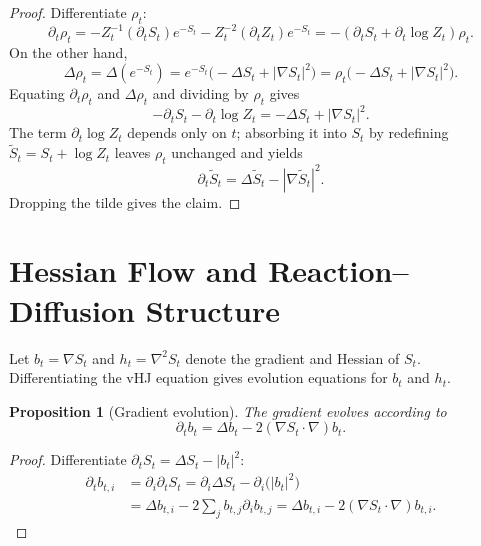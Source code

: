 \documentclass[11pt]{article}
\newtheorem{proposition}[theorem]{Proposition}
\begin{document}
\begin{proof}
Differentiate $\rho_t$:
\begin{equation}
  \partial_t\rho_t
  = -Z_t^{-1}(\partial_t S_t)e^{-S_t} - Z_t^{-2}(\partial_t Z_t)e^{-S_t}
  = -(\partial_t S_t + \partial_t\log Z_t)\rho_t.
\end{equation}
On the other hand,
\begin{equation}
  \Delta\rho_t
  = \Delta(e^{-S_t})
  = e^{-S_t}\big(-\Delta S_t + |\nabla S_t|^2\big)
  = \rho_t\big(-\Delta S_t + |\nabla S_t|^2\big).
\end{equation}
Equating $\partial_t\rho_t$ and $\Delta\rho_t$ and dividing by $\rho_t$
gives
\begin{equation}
  -\partial_t S_t - \partial_t\log Z_t
  = -\Delta S_t + |\nabla S_t|^2.
\end{equation}
The term $\partial_t\log Z_t$ depends only on $t$; absorbing it into
$S_t$ by redefining $\tilde S_t = S_t + \log Z_t$ leaves $\rho_t$ unchanged
and yields
\begin{equation}
  \partial_t \tilde S_t = \Delta \tilde S_t - |\nabla\tilde S_t|^2.
\end{equation}
Dropping the tilde gives the claim.
\end{proof}

\section{Hessian Flow and Reaction--Diffusion Structure}

Let $b_t = \nabla S_t$ and $h_t = \nabla^2 S_t$ denote the gradient and
Hessian of $S_t$. Differentiating the vHJ equation gives evolution
equations for $b_t$ and $h_t$.

\begin{proposition}[Gradient evolution]
The gradient evolves according to
\begin{equation}
  \partial_t b_t = \Delta b_t - 2(\nabla S_t\cdot\nabla)b_t.
\end{equation}
\end{proposition}

\begin{proof}
Differentiate $\partial_t S_t = \Delta S_t - |b_t|^2$:
\begin{align}
  \partial_t b_{t,i}
  &= \partial_i\partial_t S_t
   = \partial_i\Delta S_t - \partial_i\big(|b_t|^2\big) \nonumber\\
  &= \Delta b_{t,i} - 2\sum_j b_{t,j}\partial_i b_{t,j}
   = \Delta b_{t,i} - 2(\nabla S_t\cdot\nabla)b_{t,i}.
\end{align}
\end{proof}
\end{document}

